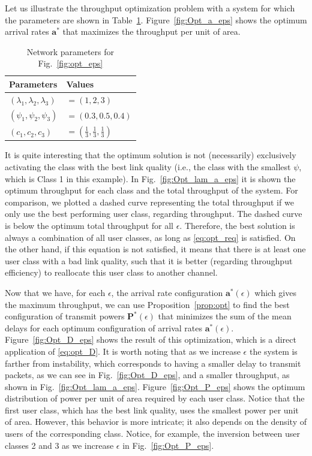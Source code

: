 Let us illustrate the throughput optimization problem with a system for which the parameters are shown in Table~\ref{tab:param}. Figure~\ref{fig:Opt_a_eps} shows the optimum arrival rates $\bm{a^*}$ that maximizes the throughput per unit of area.
%
\begin{table}[hbt]
  \centering
  \caption{Network parameters for Fig.~\ref{fig:opt_eps}}
  \begin{tabular}{l l}
        \hline
      \hline
      \textbf{Parameters} & \textbf{Values} \\
      \hline
        $(\lambda_1,\lambda_2,\lambda_3)$	& $=(1,2,3)$ \\
        $(\psi_1,\psi_2,\psi_3)$			& $=(0.3,0.5,0.4)$ \\
		$(c_1,c_2,c_3)$						& $=(\frac{1}{3},\frac{1}{3},\frac{1}{3})$ \\
      \hline
      \hline
  \end{tabular}
  \label{tab:param}
\end{table}
%
It is quite interesting that the optimum solution is not (necessarily) exclusively activating the class with the best link quality (i.e., the class with the smallest $\psi$, which is Class 1 in this example). In Fig.~\ref{fig:Opt_lam_a_eps} it is shown the optimum throughput for each class and the total throughput of the system.
%
For comparison, we plotted a dashed curve representing the total throughput if we only use the best performing user class, regarding throughput.
The dashed curve is below the optimum total throughput for all $\epsilon$. Therefore, the best solution is always a combination of all user classes, as long as \eqref{eq:opt_req} is satisfied.
%
On the other hand, if this equation is not satisfied, it means that there is at least one user class with a bad link quality, such that it is better (regarding throughput efficiency) to reallocate this user class to another channel.

Now that we have, for each $\epsilon$, the arrival rate configuration $\bm{a}^*(\epsilon)$ which gives the maximum throughput, we can use Proposition~\ref{prop:opt} to find the best configuration of transmit powers $\bm{P}^*(\epsilon)$ that minimizes the sum of the mean delays for each optimum configuration of arrival rates $\bm{a}^*(\epsilon)$.
%
Figure~\ref{fig:Opt_D_eps} shows the result of this optimization, which is a direct application of \eqref{eq:opt_D}.
%
It is worth noting that as we increase $\epsilon$ the system is farther from instability, which corresponds to having a smaller delay to transmit packets, as we can see in Fig.~\ref{fig:Opt_D_eps}, and a smaller throughput, as shown in Fig.~\ref{fig:Opt_lam_a_eps}.
%
Figure~\ref{fig:Opt_P_eps} shows the optimum distribution of power per unit of area required by each user class. Notice that the first user class, which has the best link quality, uses the smallest power per unit of area. However, this behavior is more intricate; it also depends on the density of users of the corresponding class. Notice, for example, the inversion between user classes 2 and 3 as we increase $\epsilon$ in Fig.~\ref{fig:Opt_P_eps}.


